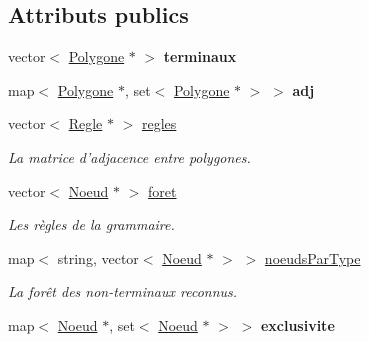 \subsection*{Attributs publics}
\begin{DoxyCompactItemize}
\item 
\hypertarget{class_parser_aa821df7860d07a050e8938a8e65eaa56}{vector$<$ \hyperlink{class_polygone}{Polygone} $\ast$ $>$ {\bfseries terminaux}}\label{class_parser_aa821df7860d07a050e8938a8e65eaa56}

\item 
\hypertarget{class_parser_af1fb4443a36f62abdbd865ee3e45b5dd}{map$<$ \hyperlink{class_polygone}{Polygone} $\ast$, set$<$ \hyperlink{class_polygone}{Polygone} $\ast$ $>$ $>$ {\bfseries adj}}\label{class_parser_af1fb4443a36f62abdbd865ee3e45b5dd}

\item 
\hypertarget{class_parser_ab12284f865e62e28eb976f9052974493}{vector$<$ \hyperlink{class_regle}{Regle} $\ast$ $>$ \hyperlink{class_parser_ab12284f865e62e28eb976f9052974493}{regles}}\label{class_parser_ab12284f865e62e28eb976f9052974493}

\begin{DoxyCompactList}\small\item\em La matrice d'adjacence entre polygones. \end{DoxyCompactList}\item 
\hypertarget{class_parser_a7fe194d2dd89651fedc7c45efefd6b63}{vector$<$ \hyperlink{class_noeud}{Noeud} $\ast$ $>$ \hyperlink{class_parser_a7fe194d2dd89651fedc7c45efefd6b63}{foret}}\label{class_parser_a7fe194d2dd89651fedc7c45efefd6b63}

\begin{DoxyCompactList}\small\item\em Les règles de la grammaire. \end{DoxyCompactList}\item 
\hypertarget{class_parser_a3d972c8e07b4cc7d827ddc67b9c2a265}{map$<$ string, vector$<$ \hyperlink{class_noeud}{Noeud} $\ast$ $>$ $>$ \hyperlink{class_parser_a3d972c8e07b4cc7d827ddc67b9c2a265}{noeuds\-Par\-Type}}\label{class_parser_a3d972c8e07b4cc7d827ddc67b9c2a265}

\begin{DoxyCompactList}\small\item\em La forêt des non-\/terminaux reconnus. \end{DoxyCompactList}\item 
\hypertarget{class_parser_ac51ef6ccbb6e71f39b763a3ae47dc718}{map$<$ \hyperlink{class_noeud}{Noeud} $\ast$, set$<$ \hyperlink{class_noeud}{Noeud} $\ast$ $>$ $>$ {\bfseries exclusivite}}\label{class_parser_ac51ef6ccbb6e71f39b763a3ae47dc718}

\end{DoxyCompactItemize}


